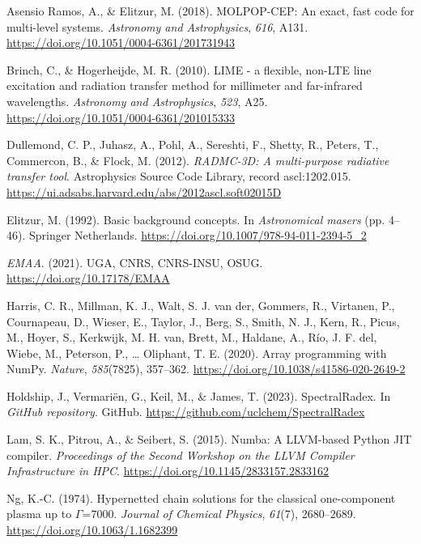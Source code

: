 \documentclass[
]{article}
\newlength{\cslhangindent}
\newenvironment{CSLReferences}[2] %
 {\begin{list}{}{%
  \setlength{\itemindent}{0pt}
  \setlength{\leftmargin}{0pt}
  \setlength{\parsep}{0pt}
  \ifodd #1
   \setlength{\leftmargin}{\cslhangindent}
   \setlength{\itemindent}{-1\cslhangindent}
  \fi
  \setlength{\itemsep}{#2\baselineskip}}}
 {\end{list}}
\begin{document}
\protect{}\label{refs}
\begin{CSLReferences}{1}{0}
Asensio Ramos, A., \& Elitzur, M. (2018). {MOLPOP-CEP}: An exact, fast
code for multi-level systems. \emph{Astronomy and Astrophysics},
\emph{616}, A131. \url{https://doi.org/10.1051/0004-6361/201731943}

Brinch, C., \& Hogerheijde, M. R. (2010). {LIME - a flexible, non-LTE
line excitation and radiation transfer method for millimeter and
far-infrared wavelengths}. \emph{Astronomy and Astrophysics},
\emph{523}, A25. \url{https://doi.org/10.1051/0004-6361/201015333}

Dullemond, C. P., Juhasz, A., Pohl, A., Sereshti, F., Shetty, R.,
Peters, T., Commercon, B., \& Flock, M. (2012). \emph{{RADMC-3D: A
multi-purpose radiative transfer tool}}. Astrophysics Source Code
Library, record ascl:1202.015.
\url{https://ui.adsabs.harvard.edu/abs/2012ascl.soft02015D}

Elitzur, M. (1992). Basic background concepts. In \emph{Astronomical
masers} (pp. 4--46). Springer Netherlands.
\url{https://doi.org/10.1007/978-94-011-2394-5_2}

\emph{EMAA}. (2021). UGA, CNRS, CNRS-INSU, OSUG.
\url{https://doi.org/10.17178/EMAA}

Harris, C. R., Millman, K. J., Walt, S. J. van der, Gommers, R.,
Virtanen, P., Cournapeau, D., Wieser, E., Taylor, J., Berg, S., Smith,
N. J., Kern, R., Picus, M., Hoyer, S., Kerkwijk, M. H. van, Brett, M.,
Haldane, A., Río, J. F. del, Wiebe, M., Peterson, P., \ldots{} Oliphant,
T. E. (2020). Array programming with {NumPy}. \emph{Nature},
\emph{585}(7825), 357--362.
\url{https://doi.org/10.1038/s41586-020-2649-2}

Holdship, J., Vermariën, G., Keil, M., \& James, T. (2023).
SpectralRadex. In \emph{GitHub repository}. GitHub.
\url{https://github.com/uclchem/SpectralRadex}

Lam, S. K., Pitrou, A., \& Seibert, S. (2015). Numba: A LLVM-based
{Python} JIT compiler. \emph{Proceedings of the Second Workshop on the
LLVM Compiler Infrastructure in HPC}.
\url{https://doi.org/10.1145/2833157.2833162}

Ng, K.-C. (1974). {Hypernetted chain solutions for the classical
one-component plasma up to {\(\Gamma\)}=7000}. \emph{Journal of Chemical
Physics}, \emph{61}(7), 2680--2689.
\url{https://doi.org/10.1063/1.1682399}


\end{CSLReferences}
\end{document}
